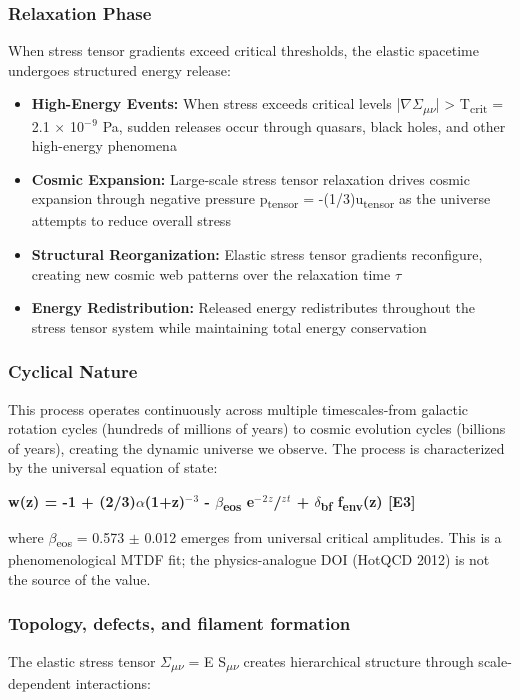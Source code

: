\documentclass[11pt,a4paper]{article}
\begin{document}
\subsubsection{Relaxation Phase}
When stress tensor gradients exceed critical thresholds, the elastic spacetime undergoes structured energy release:

\begin{itemize}
  \item \textbf{High-Energy Events:} When stress exceeds critical levels |$\nabla$$\Sigma$\textsubscript{$\mu$$\nu$}| > T\textsubscript{crit} = 2.1 $\times$ 10$^{-}$$^{9}$ Pa, sudden releases occur through quasars, black holes, and other high-energy phenomena
  \item \textbf{Cosmic Expansion:} Large-scale stress tensor relaxation drives cosmic expansion through negative pressure p\textsubscript{tensor} = -(1/\allowbreak{}3)u\textsubscript{tensor} as the universe attempts to reduce overall stress
  \item \textbf{Structural Reorganization:} Elastic stress tensor gradients reconfigure, creating new cosmic web patterns over the relaxation time $\tau$
  \item \textbf{Energy Redistribution:} Released energy redistributes throughout the stress tensor system while maintaining total energy conservation
\end{itemize}

\subsubsection{Cyclical Nature}
This process operates continuously across multiple timescales-from galactic rotation cycles (hundreds of millions of years) to cosmic evolution cycles (billions of years), creating the dynamic universe we observe. The process is characterized by the universal equation of state:

\textbf{w(z) = -1 + (2/\allowbreak{}3)$\alpha$(1+z)$^{-}$$^{3}$ - $\beta$\textsubscript{eos} e$^{-}$$^{2}$$^{z}$/$^{z}$$^{t}$ + $\delta$\textsubscript{bf} f\textsubscript{env}(z) [E3]}

where $\beta$\textsubscript{eos} = 0.573 $\pm$ 0.012 emerges from universal critical amplitudes. This is a phenomenological MTDF fit; the physics-analogue DOI (HotQCD 2012) is not the source of the value.

\subsubsection{Topology, defects, and filament formation}
The elastic stress tensor $\Sigma$\textsubscript{$\mu$$\nu$} = E S\textsubscript{$\mu$$\nu$} creates hierarchical structure through scale-dependent interactions:
\end{document}

